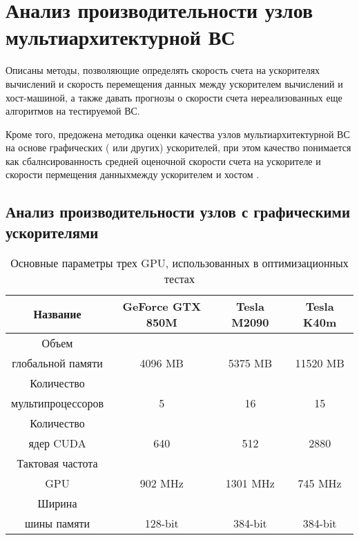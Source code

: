 \chapter{Анализ производительности узлов мультиархитектурной ВС} \label{chapt3}
Описаны методы, позволяющие определять скорость счета на ускорителях вычислений и скорость перемещения данных между ускорителем вычислений и хост-машиной, а также давать прогнозы о скорости счета нереализованных еще алгоритмов на тестируемой ВС.

Кроме того, предожена методика оценки качества узлов мультиархитектурной ВС на основе графических ( или других) ускорителей, при этом качество понимается как сбалнсированность средней оценочной скорости счета на ускорителе и скорости пермещения данныхмежду ускорителем и хостом
\cite{MohographyTarkov,VestnikNNSU,VestnikNSUadapt,VychMethProgExa,SuperFrI,astroCoDesign,integrApproach}.

\section{Анализ производительности узлов с графическими ускорителями} \label{sect3_1}

\begin{table}[ht]
	\begin{center}
		\caption{Основные параметры трех GPU, использованных в оптимизационных тестах}
		\begin{tabular}{|c|c|c|c|}
			\hline
			Название                &  GeForce GTX 850M & Tesla M2090 & Tesla K40m \\ \hline
			Объем                  &                   &             &             \\
			глобальной памяти       & 4096 MB           & 5375 MB     & 11520 MB \\ \hline
			Количество              &             &               &     \\
			мультипроцессоров       & 5           &  16           & 15  \\ \hline
			Количество              &             &               &     \\
			ядер CUDA               & 640         & 512         & 2880  \\ \hline
			Тактовая частота        &             &             &         \\
			GPU                     & 902 MHz     & 1301 MHz    & 745 MHz \\ \hline
			Ширина                  &             &             &         \\
			шины памяти             & 128-bit     & 384-bit     & 384-bit \\ \hline
		\end{tabular}
		\label{GPUs}
	\end{center}
\end{table}





